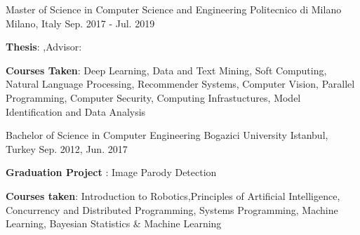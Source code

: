 \begin{cventries}
  \cventry
    {Master of Science in Computer Science and Engineering} %
    {Politecnico di Milano} %
    {Milano, Italy} %
    {Sep. 2017 - Jul. 2019} %
    {
      \begin{cvitems} %
        \item{\textbf{Thesis}: ,\quad  Advisor: }
        \item {\textbf{Courses Taken}: Deep Learning, Data and Text Mining, Soft Computing, Natural Language Processing, Recommender Systems, Computer Vision, Parallel Programming, Computer Security, Computing Infrastuctures, Model Identification and Data Analysis}
      \end{cvitems}
    }

\cventry
{Bachelor of Science in Computer Engineering } %
{Bogazici University} %
{Istanbul, Turkey} %
{Sep. 2012, Jun. 2017} %
{
  \begin{cvitems} %
    \item{\textbf{Graduation Project} : Image Parody Detection}
    \item {\textbf{Courses taken}:	Introduction to Robotics,Principles of Artificial Intelligence,
    Concurrency and Distributed Programming, Systems Programming, Machine Learning, Bayesian Statistics \& Machine Learning}
  \end{cvitems}
}


\end{cventries}
